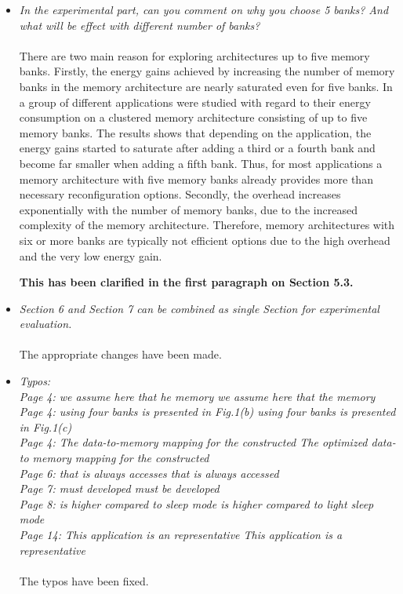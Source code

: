 \documentclass[12pt,a4paper,notitlepage]{article}
\begin{document}
\begin{itemize}
\item \textit{In the experimental part, can you comment on why you choose 5 banks? And what will be effect with different number of banks?}
\\
\\
There are two main reason for exploring architectures up to five memory banks.
Firstly, the energy gains achieved by increasing the number of memory banks in the memory architecture are nearly saturated even for five banks.
In \cite{filippopoulos2013exploration} a group of different applications were studied with regard to their energy consumption on a clustered memory architecture consisting of up to five memory banks.
The results shows that depending on the application, the energy gains started to saturate after adding a third or a fourth bank and become far smaller when adding a fifth bank.
Thus, for most applications a memory architecture with five memory banks already provides more than necessary reconfiguration options.  
Secondly, the overhead increases exponentially with the number of memory banks, due to the increased complexity of the memory architecture. 
Therefore, memory architectures with six or more banks are typically not efficient options due to the high overhead and the very low energy gain.

\textbf{This has been clarified in the first paragraph on Section 5.3.}

\item \textit{Section 6 and Section 7 can be combined as single Section for experimental evaluation.}
\\
\\
The appropriate changes have been made.

\item 
\textit{Typos: \\ 
Page 4: we assume here that he memory \textrightarrow we assume here that the memory\\ 
Page 4: using four banks is presented in Fig.1(b) \textrightarrow using four banks is presented in Fig.1(c) \\ 
Page 4: The data-to-memory mapping for the constructed \textrightarrow The optimized data-to memory mapping for the constructed \\ 
Page 6: that is always accesses \textrightarrow that is always accessed \\ 
Page 7: must developed \textrightarrow must be developed \\ 
Page 8: is higher compared to sleep mode \textrightarrow is higher compared to light sleep mode \\ Page 14: This application is an representative \textrightarrow This application is a representative}
\\
\\
The typos have been fixed.

\end{itemize}
\end{document}
